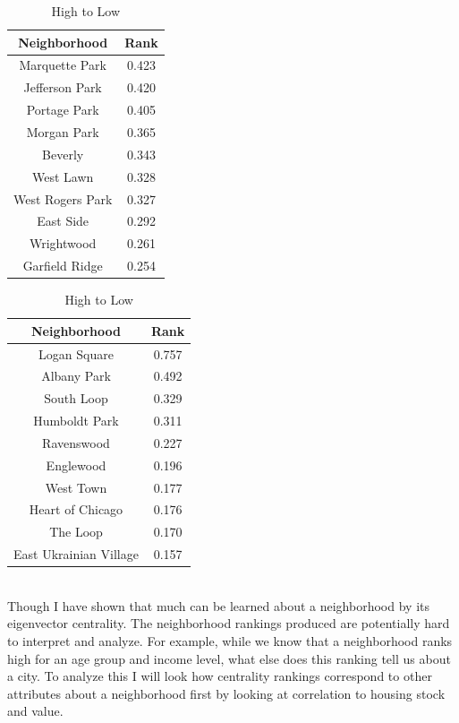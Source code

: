 \documentclass{article}
\theoremstyle{definition}
\theoremstyle{remark}
\begin{document}
\begin{table}[!htb]

\caption{Housing Rank Income Changes}\label{thelabel}
\begin{minipage}{.5\linewidth}
      \caption{Low to High}
      \centering
      
\begin{tabular}{||c | c ||} 
 \hline
Neighborhood &  Rank\\[0.5ex] 
 \hline\hline
Marquette Park & 0.423 \\
Jefferson Park & 0.420 \\
Portage Park & 0.405 \\
Morgan Park & 0.365 \\
Beverly & 0.343 \\
West Lawn & 0.328 \\
West Rogers Park & 0.327 \\
East Side & 0.292 \\
Wrightwood & 0.261 \\
Garfield Ridge & 0.254 \\
\hline
 \end{tabular}

\end{minipage}%
    \begin{minipage}{.5\linewidth}
      \centering
\caption{High to Low}\label{thelabel}

\begin{tabular}{||c | c ||} 
 \hline
Neighborhood &  Rank\\[0.5ex] 
 \hline\hline
Logan Square & 0.757 \\
Albany Park & 0.492 \\
South Loop & 0.329 \\
Humboldt Park & 0.311 \\
Ravenswood & 0.227 \\
Englewood & 0.196 \\
West Town & 0.177 \\
Heart of Chicago & 0.176 \\
The Loop & 0.170 \\
East Ukrainian Village & 0.157 \\
\hline
 \end{tabular}
\end{minipage} 
\end{table}

\\

Though I have shown that much can be learned about a neighborhood by its eigenvector centrality.  The neighborhood rankings produced are potentially hard to interpret and analyze.  For example, while we know that a neighborhood ranks high for an age group and income level, what else does this ranking tell us about a city.  To analyze this I will look how centrality rankings correspond to other attributes about a neighborhood first by looking at correlation to housing stock and value.
\end{document}
